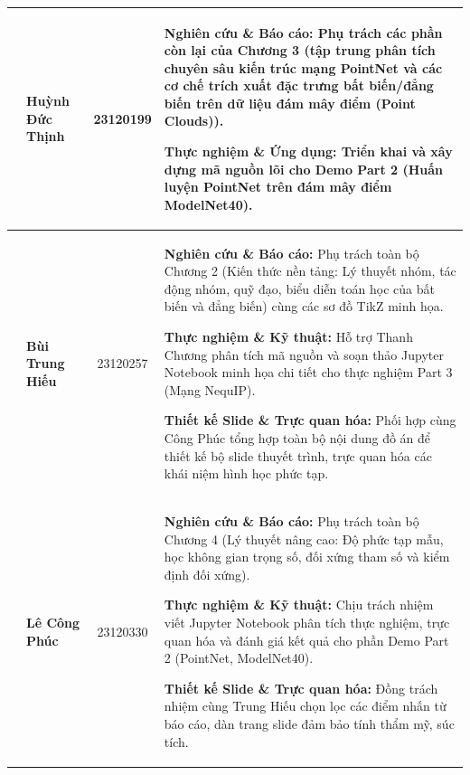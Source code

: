 \begin{longtable}{|>{\stepcounter{memberrow}\thememberrow}c|p{3.2cm}|c|p{9.5cm}|}
\textbf{} & \textbf{Huỳnh Đức Thịnh} & 23120199 &
\begin{tableitemize}
    \item \textbf{Nghiên cứu \& Báo cáo:} Phụ trách các phần còn lại của Chương 3 (tập trung phân tích chuyên sâu kiến trúc mạng PointNet và các cơ chế trích xuất đặc trưng bất biến/đẳng biến trên dữ liệu đám mây điểm (Point Clouds)).
    \item \textbf{Thực nghiệm \& Ứng dụng:} Triển khai và xây dựng mã nguồn lõi cho Demo Part 2 (Huấn luyện PointNet trên đám mây điểm ModelNet40).
\end{tableitemize} \\ \hline

\textbf{} & \textbf{Bùi Trung Hiếu} & 23120257 &
\begin{tableitemize}
    \item \textbf{Nghiên cứu \& Báo cáo:} Phụ trách toàn bộ Chương 2 (Kiến thức nền tảng: Lý thuyết nhóm, tác động nhóm, quỹ đạo, biểu diễn toán học của bất biến và đẳng biến) cùng các sơ đồ TikZ minh họa.
    \item \textbf{Thực nghiệm \& Kỹ thuật:} Hỗ trợ Thanh Chương phân tích mã nguồn và soạn thảo Jupyter Notebook minh họa chi tiết cho thực nghiệm Part 3 (Mạng NequIP).
    \item \textbf{Thiết kế Slide \& Trực quan hóa:} Phối hợp cùng Công Phúc tổng hợp toàn bộ nội dung đồ án để thiết kế bộ slide thuyết trình, trực quan hóa các khái niệm hình học phức tạp.
\end{tableitemize} \\ \hline

\textbf{} & \textbf{Lê Công Phúc} & 23120330 &
\begin{tableitemize}
    \item \textbf{Nghiên cứu \& Báo cáo:} Phụ trách toàn bộ Chương 4 (Lý thuyết nâng cao: Độ phức tạp mẫu, học không gian trọng số, đối xứng tham số và kiểm định đối xứng).
    \item \textbf{Thực nghiệm \& Kỹ thuật:} Chịu trách nhiệm viết Jupyter Notebook phân tích thực nghiệm, trực quan hóa và đánh giá kết quả cho phần Demo Part 2 (PointNet, ModelNet40).
    \item \textbf{Thiết kế Slide \& Trực quan hóa:} Đồng trách nhiệm cùng Trung Hiếu chọn lọc các điểm nhấn từ báo cáo, dàn trang slide đảm bảo tính thẩm mỹ, súc tích.
\end{tableitemize} \\ \hline

\end{longtable}
\endgroup

